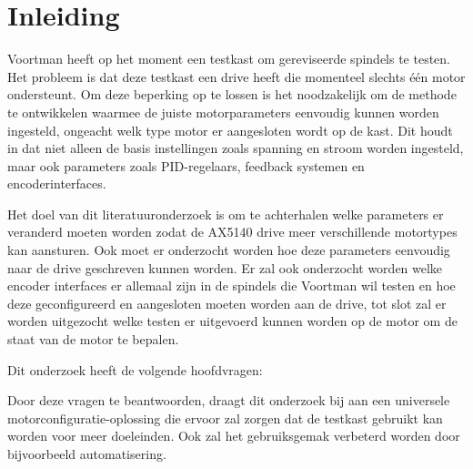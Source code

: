 \section{Inleiding}

Voortman heeft op het moment een testkast om gereviseerde spindels te testen. Het probleem is dat deze testkast een drive heeft die momenteel slechts één motor ondersteunt. Om deze beperking op te lossen is het noodzakelijk om de methode te ontwikkelen waarmee de juiste motorparameters eenvoudig kunnen worden ingesteld, ongeacht welk type motor er aangesloten wordt op de kast. Dit houdt in dat niet alleen de basis instellingen zoals spanning en stroom worden ingesteld, maar ook parameters zoals PID-regelaars, feedback systemen en encoderinterfaces.

\vspace{0.5cm}

Het doel van dit literatuuronderzoek is om te achterhalen welke parameters er veranderd moeten worden zodat de AX5140 drive meer verschillende motortypes kan aansturen. Ook moet er onderzocht worden hoe deze parameters eenvoudig naar de drive geschreven kunnen worden. Er zal ook onderzocht worden welke encoder interfaces er allemaal zijn in de spindels die Voortman wil testen en hoe deze geconfigureerd en aangesloten moeten worden aan de drive, tot slot zal er worden uitgezocht welke testen er uitgevoerd kunnen worden op de motor om de staat van de motor te bepalen. 

\vspace{0.5cm}

Dit onderzoek heeft de volgende hoofdvragen:



Door deze vragen te beantwoorden, draagt dit onderzoek bij aan een universele motorconfiguratie-oplossing die ervoor zal zorgen dat de testkast gebruikt kan worden voor meer doeleinden. Ook zal het gebruiksgemak verbeterd worden door bijvoorbeeld automatisering.